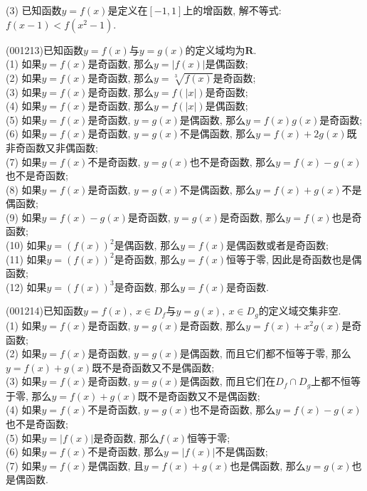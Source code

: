 (3) 已知函数$y=f(x)$是定义在$[-1,1]$上的增函数, 解不等式: $f(x-1)<f(x^2-1)$.
\item (001213)已知函数$y=f(x)$与$y=g(x)$的定义域均为$\mathbf{R}$.\\ 
(1) 如果$y=f(x)$是奇函数, 那么$y=|f(x)|$是偶函数;\\ 
(2) 如果$y=f(x)$是奇函数, 那么$y=\sqrt[3]{f(x)}$是奇函数;\\ 
(3) 如果$y=f(x)$是奇函数, 那么$y=f(|x|)$是奇函数;\\ 
(4) 如果$y=f(x)$是奇函数, 那么$y=f(|x|)$是偶函数;\\ 
(5) 如果$y=f(x)$是奇函数, $y=g(x)$是偶函数, 那么$y=f(x)g(x)$是奇函数;\\ 
(6) 如果$y=f(x)$是奇函数, $y=g(x)$不是偶函数, 那么$y=f(x)+2g(x)$既非奇函数又非偶函数;\\ 
(7) 如果$y=f(x)$不是奇函数, $y=g(x)$也不是奇函数, 那么$y=f(x)-g(x)$也不是奇函数;\\ 
(8) 如果$y=f(x)$是奇函数, $y=g(x)$不是偶函数, 那么$y=f(x)+g(x)$不是偶函数;\\ 
(9) 如果$y=f(x)-g(x)$是奇函数, $y=g(x)$是奇函数, 那么$y=f(x)$也是奇函数;\\ 
(10) 如果$y=(f(x))^2$是偶函数, 那么$y=f(x)$是偶函数或者是奇函数;\\ 
(11) 如果$y=(f(x))^2$是奇函数, 那么$y=f(x)$恒等于零, 因此是奇函数也是偶函数;\\ 
(12) 如果$y=(f(x))^3$是奇函数, 那么$y=f(x)$是奇函数.
\item (001214)已知函数$y=f(x),\ x \in D_f$与$y=g(x),\ x \in D_g$的定义域交集非空.\\ 
(1) 如果$y=f(x)$是奇函数, $y=g(x)$是奇函数, 那么$y=f(x)+x^2g(x)$是奇函数;\\ 
(2) 如果$y=f(x)$是奇函数, $y=g(x)$是偶函数, 而且它们都不恒等于零, 那么$y=f(x)+g(x)$既不是奇函数又不是偶函数;\\ 
(3) 如果$y=f(x)$是奇函数, $y=g(x)$是偶函数, 而且它们在$D_f\cap D_g$上都不恒等于零, 那么$y=f(x)+g(x)$既不是奇函数又不是偶函数;\\ 
(4) 如果$y=f(x)$不是奇函数, $y=g(x)$也不是奇函数, 那么$y=f(x)-g(x)$也不是奇函数;\\ 
(5) 如果$y=|f(x)|$是奇函数, 那么$f(x)$恒等于零;\\ 
(6) 如果$y=f(x)$不是奇函数, 那么$y=|f(x)|$不是偶函数;\\ 
(7) 如果$y=f(x)$是偶函数, 且$y=f(x)+g(x)$也是偶函数, 那么$y=g(x)$也是偶函数.
